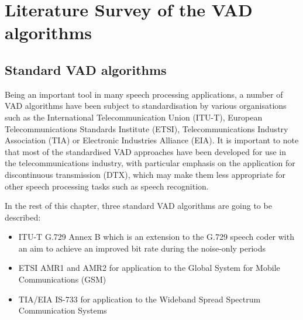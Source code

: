 
\chapter{Literature Survey of the VAD algorithms} %

\label{Chapter2} %



\section{Standard VAD algorithms}

Being an important tool in many speech processing applications, a number of VAD algorithms have been subject to standardisation by various organisations such as the International Telecommunication Union (ITU-T), European Telecommunications Standards Institute (ETSI), Telecommunications Industry Association (TIA) or Electronic Industries Alliance (EIA). It is important to note that most of the standardised VAD approaches have been developed for use in the telecommunications industry, with particular emphasis on the application for discontinuous transmission (DTX), which may make them less appropriate for other speech processing tasks such as speech recognition.

In the rest of this chapter, three standard VAD algorithms are going to be described:
\begin{itemize}
\item ITU-T G.729 Annex B \citep{G729} which is an extension to the G.729 speech coder with an aim to achieve an improved bit rate during the noise-only periods
\item ETSI AMR1 and AMR2 \cite{AMR} for application to the Global System for Mobile Communications (GSM)
\item TIA/EIA IS-733 \cite{IS733} for application to the Wideband Spread Spectrum Communication Systems
\end{itemize}

